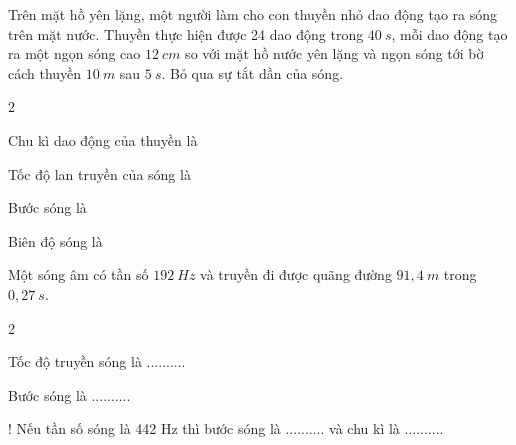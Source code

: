 \begin{vidu}
Trên mặt hồ yên lặng, một người làm cho con thuyền nhỏ dao động tạo ra sóng trên mặt nước. Thuyền thực hiện được 24 dao động trong $40\ s$, mỗi dao động tạo ra một ngọn sóng cao $12\ cm$ so với mặt hồ nước yên lặng và ngọn sóng tới bờ cách thuyền $10\ m$ sau $5\ s$. Bỏ qua sự tắt dần của sóng.
\begin{enumEX}[1.]{2}
\item Chu kì dao động của thuyền là \dotfill
\item Tốc độ lan truyền của sóng là \dotfill
\item Bước sóng là \dotfill
\item Biên độ sóng là \dotfill
\end{enumEX}
\end{vidu} %
\begin{vidu}%
Một sóng âm có tần số $192\ Hz$ và truyền đi được quãng đường $91,4\ m$ trong $0,27\ s$.
\begin{enumEX}[1.]{2}
\item Tốc độ truyền sóng là ..........
\item Bước sóng  là ..........
\item! Nếu tần số sóng là 442 Hz thì bước sóng  là .......... và chu kì là ..........
\end{enumEX}
\end{vidu} %


